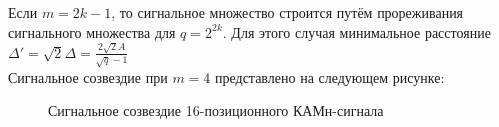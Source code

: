 Если $m=2k-1$, то сигнальное множество строится путём прореживания сигнального множества для $ q=2^{{2k}}$. Для этого случая минимальное расстояние $\Delta '={\sqrt 2}\Delta ={\frac {2{\sqrt 2}A}{{\sqrt q}-1}}$ \\
Сигнальное созвездие при $m=4$ представлено на следующем рисунке:
\begin{figure}[h]
\caption{Сигнальное созвездие 16-позиционного КАМн-сигнала}
\label{fig:image}
\end{figure}

